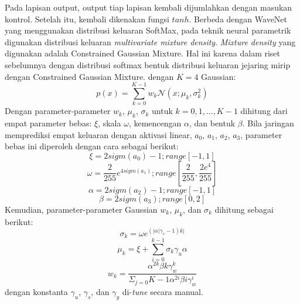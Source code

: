 Pada lapisan output, output tiap lapisan kembali dijumlahkan dengan masukan kontrol. Setelah itu, kembali dikenakan fungsi $tanh$\parencite{bonada2017singing}. Berbeda dengan WaveNet \parencite{Oord2016WaveNetAG} yang menggunakan distribusi keluaran SoftMax, pada teknik neural parametrik digunakan distribusi keluaran \textit{multivariate mixture density}. \textit{Mixture density} yang digunakan adalah Constrained Gaussian Mixture. Hal ini karena dalam riset sebelumnya dengan distribusi softmax bentuk distribusi keluaran jejaring mirip dengan Constrained Gaussian Mixture. dengan $K=4$ Gaussian: \parencite{bonada2017singing}
\begin{equation}
    p(x) = \sum\limits_{k=0}^{K-1}w_k\mathcal{N}(x;\mu_k,\sigma_k^2)
\end{equation}\label{eq-cgm}
Dengan parameter-parameter $w_k$, $\mu_k$, $\sigma_k$ untuk $k=0,1,...,K-1$ dihitung dari empat parameter bebas: $\xi$, skala $\omega$, kemencengan $\alpha$, dan bentuk $\beta$. Bila jaringan memprediksi empat keluaran dengan aktivasi linear, $a_0$, $a_1$, $a_2$, $a_3$, parameter bebas ini diperoleh dengan cara sebagai berikut: \parencite{bonada2017singing}
\begin{equation}
    \xi = 2 sigm(a_0)-1; range[-1,1]
\end{equation}\begin{equation}
    \omega = \dfrac{2}{255}e^{4sigm(a_1)}; range[\dfrac{2}{255}, \dfrac{2 e^4}{255}]
\end{equation}\begin{equation}
    \alpha = 2 sigm(a_2)-1; range[-1,1]
\end{equation}\begin{equation}
    \beta = 2 sigm(a_3); range[0,2]
\end{equation}
Kemudian, parameter-parameter Gaussian $w_k$, $\mu_k$, dan $\sigma_k$ dihitung sebagai berikut:\parencite{bonada2017singing}
\begin{equation}
    \sigma_k = \omega e^{(|\alpha|\gamma_s-1)k|}
\end{equation}\begin{equation}
    \mu_k = \xi + \sum\limits_{i=0}^{k-1}\sigma_k\gamma_u\alpha
\end{equation}\begin{equation}
    w_k = \dfrac{\alpha^{2k}\beta{k}\gamma_w^k}{\Sigma_{j=0}{K-1}\alpha^{2i}\beta{i}\gamma_w^i}
\end{equation}
dengan konstanta $\gamma_u$, $\gamma_s$, dan $\gamma_y$ di-\textit{tune} secara manual.

